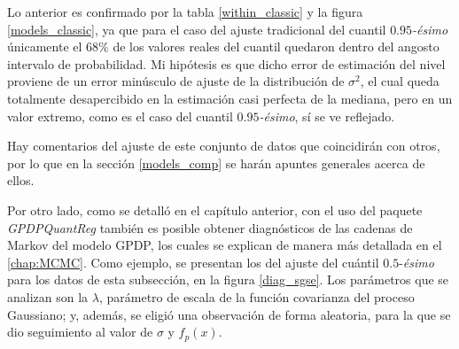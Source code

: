 Lo anterior es confirmado por la tabla \ref{within_classic} y la figura \ref{models_classic}, ya que para el caso del ajuste tradicional del cuantil $0.95$\textit{-\'esimo} \'unicamente el $68\%$ de los valores reales del cuantil quedaron dentro del angosto intervalo de probabilidad. Mi hip\'otesis es que dicho error de estimaci\'on del nivel proviene de un error min\'usculo de ajuste de la distribuci\'on de $\sigma^2$, el cual queda totalmente desapercibido en la estimaci\'on casi perfecta de la mediana, pero en un valor extremo, como es el caso del cuantil $0.95$\textit{-\'esimo}, s\'i se ve reflejado.

Hay comentarios del ajuste de este conjunto de datos que coincidir\'an con otros, por lo que en la secci\'on \ref{models_comp} se har\'an apuntes generales acerca de ellos.

Por otro lado, como se detall\'o en el cap\'itulo anterior, con el uso del paquete \textit{GPDPQuantReg} tambi\'en es posible obtener diagn\'osticos de las cadenas de Markov del modelo GPDP, los cuales se explican de manera m\'as detallada en el \autoref{chap:MCMC}. Como ejemplo, se presentan los del ajuste del cu\'antil $0.5$-\textit{\'esimo} para los datos de esta subsecci\'on, en la figura \ref{diag_sgse}. Los par\'ametros que se analizan son la $\lambda$, par\'ametro de escala de la funci\'on covarianza del proceso Gaussiano; y, adem\'as, se eligi\'o una observaci\'on de forma aleatoria, para la que se dio seguimiento al valor de $\sigma$ y $f_p(x)$. 

